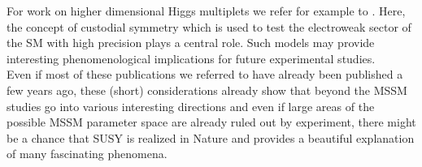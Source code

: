For work on higher dimensional Higgs multiplets we refer for example to \cite{Delgado2012}. Here, the concept of custodial symmetry which is used to test the electroweak sector of the SM with high precision plays a central role. Such models may provide interesting phenomenological implications for future experimental studies. \\
Even if most of these publications we referred to have already been published a few years ago, these (short) considerations already show that beyond the MSSM studies go into various interesting directions and even if large areas of the possible MSSM parameter space are already ruled out by experiment, there might be a chance that SUSY is realized in Nature and provides a beautiful explanation of many fascinating phenomena.
\newpage